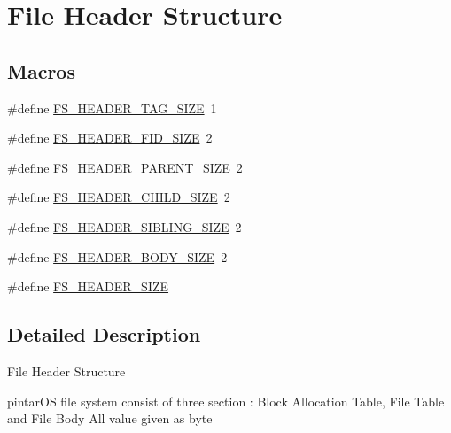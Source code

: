 \hypertarget{group__fs__header}{\section{File Header Structure}
\label{group__fs__header}
}
\subsection*{Macros}
\begin{DoxyCompactItemize}
\item 
\#define \hyperlink{group__fs__header_ga499f64a7727690bf0d5281e16539a95a}{F\-S\-\_\-\-H\-E\-A\-D\-E\-R\-\_\-\-T\-A\-G\-\_\-\-S\-I\-Z\-E}~1
\item 
\#define \hyperlink{group__fs__header_ga9ebf8374931fc290233a3fd175a1593c}{F\-S\-\_\-\-H\-E\-A\-D\-E\-R\-\_\-\-F\-I\-D\-\_\-\-S\-I\-Z\-E}~2
\item 
\#define \hyperlink{group__fs__header_gae31c4ce686bea764e72c6ba0f49ed672}{F\-S\-\_\-\-H\-E\-A\-D\-E\-R\-\_\-\-P\-A\-R\-E\-N\-T\-\_\-\-S\-I\-Z\-E}~2
\item 
\#define \hyperlink{group__fs__header_gaa8acbe7b4b0c8c5e9213afa90b528142}{F\-S\-\_\-\-H\-E\-A\-D\-E\-R\-\_\-\-C\-H\-I\-L\-D\-\_\-\-S\-I\-Z\-E}~2
\item 
\#define \hyperlink{group__fs__header_ga7e470e354b3fa15e3880ecdb8784c6a2}{F\-S\-\_\-\-H\-E\-A\-D\-E\-R\-\_\-\-S\-I\-B\-L\-I\-N\-G\-\_\-\-S\-I\-Z\-E}~2
\item 
\#define \hyperlink{group__fs__header_ga4aecac06373354147de5dfec4ba14ca9}{F\-S\-\_\-\-H\-E\-A\-D\-E\-R\-\_\-\-B\-O\-D\-Y\-\_\-\-S\-I\-Z\-E}~2
\item 
\#define \hyperlink{group__fs__header_ga1031facaa31a457c28f86cf221f16bc0}{F\-S\-\_\-\-H\-E\-A\-D\-E\-R\-\_\-\-S\-I\-Z\-E}
\end{DoxyCompactItemize}


\subsection{Detailed Description}
File Header Structure

pintar\-O\-S file system consist of three section \-: Block Allocation Table, File Table and File Body All value given as byte 

